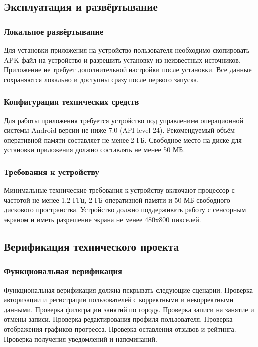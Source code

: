 \subsection{Эксплуатация и развёртывание}

\subsubsection{Локальное развёртывание}

Для установки приложения на устройство пользователя необходимо скопировать APK-файл на устройство и разрешить установку из неизвестных источников. Приложение не требует дополнительной настройки после установки. Все данные сохраняются локально и доступны сразу после первого запуска.

\subsubsection{Конфигурация технических средств}

Для работы приложения требуется устройство под управлением операционной системы Android версии не ниже 7.0 (API level 24). Рекомендуемый объём оперативной памяти составляет не менее 2 ГБ. Свободное место на диске для установки приложения должно составлять не менее 50 МБ.

\subsubsection{Требования к устройству}

Минимальные технические требования к устройству включают процессор с частотой не менее 1,2 ГГц, 2 ГБ оперативной памяти и 50 МБ свободного дискового пространства. Устройство должно поддерживать работу с сенсорным экраном и иметь разрешение экрана не менее 480x800 пикселей.

\subsection{Верификация технического проекта}

\subsubsection{Функциональная верификация}

Функциональная верификация должна покрывать следующие сценарии. Проверка авторизации и регистрации пользователей с корректными и некорректными данными. Проверка фильтрации занятий по городу. Проверка записи на занятие и отмены записи. Проверка редактирования профиля пользователя. Проверка отображения графиков прогресса. Проверка оставления отзывов и рейтинга. Проверка получения уведомлений и напоминаний.

